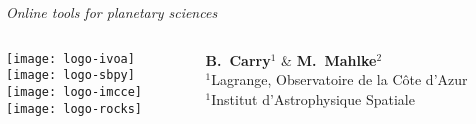 \begin{frame}

  \begin{center}

    \emph{\Large Online tools for planetary sciences}\\

    \vspace{2em}
    \begin{columns}[T]
      \begin{column}{.3\textwidth}
        \vspace{0.5em}\texttt{[image: logo-ivoa]}\\
        \vspace{0.5em}\texttt{[image: logo-sbpy]}\\
        \vspace{0.5em}\texttt{[image: logo-imcce]}\\
        \vspace{0.5em}\texttt{[image: logo-rocks]}
      \end{column}
      \begin{column}{.7\textwidth}
        \small
        \vspace{3cm}
        \textbf{B.~Carry}$^1$ \&
        \textbf{M.~Mahlke}$^2$\\
        \footnotesize{$^1$Lagrange, Observatoire de la C{\^o}te d'Azur}\\
        \footnotesize{$^1$Institut d'Astrophysique Spatiale}
      \end{column}
    \end{columns}

  \end{center}

\end{frame}
